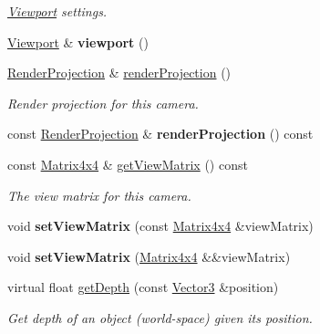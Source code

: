 \begin{Indent}
\begin{DoxyCompactItemize}
\begin{DoxyCompactList}\small\item\em \mbox{\hyperlink{classrev_1_1_viewport}{Viewport}} settings. \end{DoxyCompactList}\item 
\mbox{\label{classrev_1_1_camera_afb83e879ba2ebbee6a41d953ad45b6ce}} 
\mbox{\hyperlink{classrev_1_1_viewport}{Viewport}} \& {\bfseries viewport} ()
\item 
\mbox{\label{classrev_1_1_camera_ad639af28488d974bc4411e583b359388}} 
\mbox{\hyperlink{classrev_1_1_render_projection}{Render\+Projection}} \& \mbox{\hyperlink{classrev_1_1_camera_ad639af28488d974bc4411e583b359388}{render\+Projection}} ()
\begin{DoxyCompactList}\small\item\em Render projection for this camera. \end{DoxyCompactList}\item 
\mbox{\label{classrev_1_1_camera_a5befd900597815578d5853a23f70a8bc}} 
const \mbox{\hyperlink{classrev_1_1_render_projection}{Render\+Projection}} \& {\bfseries render\+Projection} () const
\item 
\mbox{\label{classrev_1_1_camera_a34cba1cf4bb4174763481facec72c5cd}} 
const \mbox{\hyperlink{classrev_1_1_square_matrix}{Matrix4x4}} \& \mbox{\hyperlink{classrev_1_1_camera_a34cba1cf4bb4174763481facec72c5cd}{get\+View\+Matrix}} () const
\begin{DoxyCompactList}\small\item\em The view matrix for this camera. \end{DoxyCompactList}\item 
\mbox{\label{classrev_1_1_camera_a10c49a9e12765fce6df4298dae685a79}} 
void {\bfseries set\+View\+Matrix} (const \mbox{\hyperlink{classrev_1_1_square_matrix}{Matrix4x4}} \&view\+Matrix)
\item 
\mbox{\label{classrev_1_1_camera_ace988d597f0cf2ffe56f09768c181b61}} 
void {\bfseries set\+View\+Matrix} (\mbox{\hyperlink{classrev_1_1_square_matrix}{Matrix4x4}} \&\&view\+Matrix)
\item 
virtual float \mbox{\hyperlink{classrev_1_1_camera_a3b0239e64437defa4469e3b914661ffc}{get\+Depth}} (const \mbox{\hyperlink{classrev_1_1_vector}{Vector3}} \&position)
\begin{DoxyCompactList}\small\item\em Get depth of an object (world-\/space) given its position. \end{DoxyCompactList}\end{DoxyCompactItemize}
\end{Indent}
